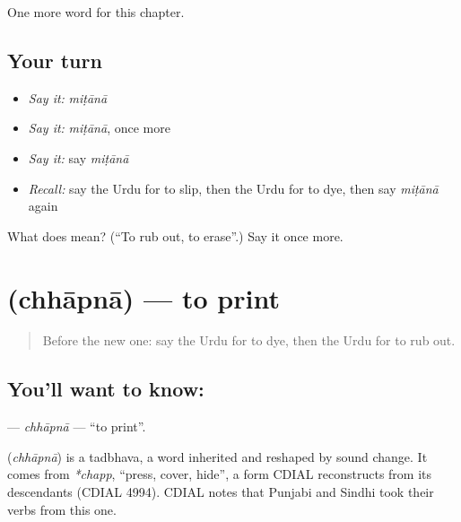 \begin{grammarlens}[title={What you've built}]
One more word for this chapter.
\end{grammarlens}

\subsection*{Your turn}
\begin{itemize}
\raggedright
  \item \emph{Say it:} \emph{miṭānā}
  \item \emph{Say it:} \emph{miṭānā}, once more
  \item \emph{Say it:} say \emph{miṭānā}
  \item \emph{Recall:} say the Urdu for to slip, then the Urdu for to dye, then say \emph{miṭānā} again
\end{itemize}

\begin{tcolorbox}[breakable,colback=teal!4,colframe=teal!35!black,title={Before you move on}]
What does  mean? (\textquotedblleft{}To rub out, to erase\textquotedblright{}.) Say it once more.
\end{tcolorbox}
\section[\texorpdfstring{\ur{چھاپنا} (chhāpnā)}{چھاپنا (chhāpnā)}]{ (chhāpnā) — to print}

\label{lesson:UR-C150-chhapna}



\begin{quote}
Before the new one: say the Urdu for to dye, then the Urdu for to rub out.
\end{quote}

\subsection*{You'll want to know: }
\textbf{} — \emph{chhāpnā} — \textquotedblleft{}to print\textquotedblright{}.

\begin{cousinweb}
\textbf{} (\emph{chhāpnā}) is a tadbhava, a word inherited and reshaped by sound change. It comes from \emph{*chapp}, \textquotedblleft{}press, cover, hide\textquotedblright{}, a form CDIAL reconstructs from its descendants (CDIAL 4994). CDIAL notes that Punjabi and Sindhi took their verbs from this one.
\end{cousinweb}

